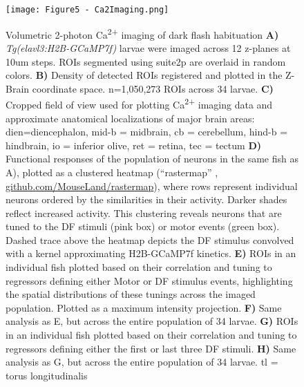 \documentclass[9pt,lineno]{RandlettLab_elife}
\begin{document}
\begin{figure}
\begin{fullwidth}
\begin{center}
\texttt{[image: Figure5 - Ca2Imaging.png]}
\caption{
Volumetric 2-photon Ca\textsuperscript{2+} imaging of dark flash habituation
\textbf{A)} \textit{Tg(elavl3:H2B-GCaMP7f)} larvae were imaged across 12 z-planes at 10um steps. ROIs segmented using suite2p \cite{Pachitariu2017-ad} are overlaid in random colors. 
\textbf{B)} Density of detected ROIs registered and plotted in the Z-Brain coordinate space. n=1,050,273 ROIs across 34 larvae. 
\textbf{C)} Cropped field of view used for plotting Ca\textsuperscript{2+} imaging data and approximate anatomical localizations of major brain areas: dien=diencephalon, mid-b = midbrain, cb = cerebellum, hind-b = hindbrain, io = inferior olive, ret = retina, tec = tectum
\textbf{D)} Functional responses of the population of neurons in the same fish as A), plotted as a clustered heatmap (“rastermap” \cite{Pachitariu2017-ad}, \href{https://github.com/MouseLand/rastermap}{github.com/MouseLand/rastermap}), where rows represent individual neurons ordered by the similarities in their activity. Darker shades reflect increased activity. This clustering reveals neurons that are tuned to the DF stimuli (pink box) or motor events (green box). Dashed trace above the heatmap depicts the DF stimulus convolved with a kernel approximating H2B-GCaMP7f kinetics.
\textbf{E)} ROIs in an individual fish plotted based on their correlation and tuning to regressors defining either Motor or DF stimulus events, highlighting the spatial distributions of these tunings across the imaged population. Plotted as a maximum intensity projection. 
\textbf{F)} Same analysis as E, but across the entire population of 34 larvae. 
\textbf{G)} ROIs in an individual fish plotted based on their correlation and tuning to regressors defining either the first or last three DF stimuli. 
\textbf{H)} Same analysis as G, but across the entire population of 34 larvae. tl = torus longitudinalis
}
\label{fig:5}
\end{center}
\end{fullwidth}
\end{figure}
\end{document}
